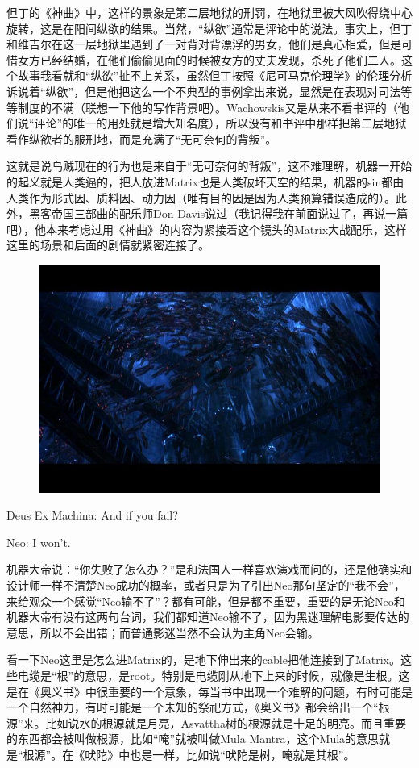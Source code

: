 \documentclass[UTF8]{ctexart}
\newenvironment{myquote}{\color{green} \setlength{\leftskip}{6em} \setlength{\rightskip}{4em} \setlength{\parindent}{-2em}}{\par}
\begin{document}
但丁的《神曲》中，这样的景象是第二层地狱的刑罚，在地狱里被大风吹得绕中心旋转，这是在阳间纵欲的结果。当然，“纵欲”通常是评论中的说法。事实上，但丁和维吉尔在这一层地狱里遇到了一对背对背漂浮的男女，他们是真心相爱，但是可惜女方已经结婚，在他们偷偷见面的时候被女方的丈夫发现，杀死了他们二人。这个故事我看就和“纵欲”扯不上关系，虽然但丁按照《尼可马克伦理学》的伦理分析诉说着“纵欲”，但是他把这么一个不典型的事例拿出来说，显然是在表现对司法等等制度的不满（联想一下他的写作背景吧）。Wachowskis又是从来不看书评的（他们说“评论”的唯一的用处就是增大知名度），所以没有和书评中那样把第二层地狱看作纵欲者的服刑地，而是充满了“无可奈何的背叛”。

这就是说乌贼现在的行为也是来自于“无可奈何的背叛”，这不难理解，机器一开始的起义就是人类逼的，把人放进Matrix也是人类破坏天空的结果，机器的sin都由人类作为形式因、质料因、动力因（唯有目的因是因为人类预算错误造成的）。此外，黑客帝国三部曲的配乐师Don Davis说过（我记得我在前面说过了，再说一篇吧），他本来考虑过用《神曲》的内容为紧接着这个镜头的Matrix大战配乐，这样这里的场景和后面的剧情就紧密连接了。

\begin{figure}[htb]
\centering
\includegraphics[width=0.5\linewidth]{fig/4c9bd62ac00a012cd42af1d3.jpg}
\end{figure}

\begin{myquote}
Deus Ex Machina: And if you fail?

Neo: I won't.
\end{myquote}

机器大帝说：“你失败了怎么办？”是和法国人一样喜欢演戏而问的，还是他确实和设计师一样不清楚Neo成功的概率，或者只是为了引出Neo那句坚定的“我不会”，来给观众一个感觉“Neo输不了”？都有可能，但是都不重要，重要的是无论Neo和机器大帝有没有这两句台词，我们都知道Neo输不了，因为黑迷理解电影要传达的意思，所以不会出错；而普通影迷当然不会认为主角Neo会输。

看一下Neo这里是怎么进Matrix的，是地下伸出来的cable把他连接到了Matrix。这些电缆是“根”的意思，是root。特别是电缆刚从地下上来的时候，就像是生根。这是在《奥义书》中很重要的一个意象，每当书中出现一个难解的问题，有时可能是一个自然神力，有时可能是一个未知的祭祀方式，《奥义书》都会给出一个“根源”来。比如说水的根源就是月亮，Asvattha树的根源就是十足的明亮。而且重要的东西都会被叫做根源，比如“唵”就被叫做Mula Mantra，这个Mula的意思就是“根源”。在《吠陀》中也是一样，比如说“吠陀是树，唵就是其根”。
\end{document}
